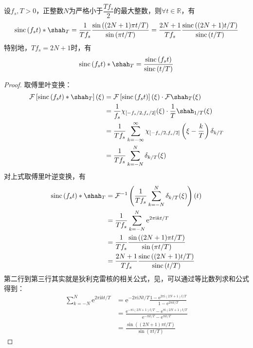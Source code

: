 \begin{lemma}
    设$f_s,T>0$，正整数$N$为严格小于$\dfrac{T f_s}{2}$的最大整数，则$\forall t\in\mathbb{R}$，有
    \begin{align*}
        \mathrm{sinc}\left(f_s t\right)*\shah_T=\frac{1}{T f_s}\frac{\sin\left((2N+1)\pi t/T\right)}{\sin\left(\pi t/T\right)}=\frac{2N+1}{T f_s}\frac{\mathrm{sinc}\left((2N+1)t/T\right)}{\mathrm{sinc}\left(t/T\right)}
    \end{align*}
    特别地，$T f_s=2N+1$时，有
    \begin{align*}
        \mathrm{sinc}\left(f_s t\right)*\shah_T=\frac{\mathrm{sinc}\left(f_s t\right)}{\mathrm{sinc}\left(t/T\right)}
    \end{align*}
\end{lemma}
\begin{proof}
    取傅里叶变换：
\begin{align*}
    \mathcal{F} \left[\mathrm{sinc}\left(f_s t\right)*\shah_T\right](\xi)&=\mathcal{F} \left[\mathrm{sinc}\left(f_s t\right)\right](\xi)\cdot\mathcal{F} \shah_T(\xi)\\
    &=\frac{1}{f_s}\chi_{[-f_s/2,f_s/2]}(\xi)\cdot\frac{1}{T}\shah_{1/T}(\xi)\\
    &=\frac{1}{T f_s}\sum_{k=-\infty}^{\infty}\chi_{[-f_s/2,f_s/2]}\left(\xi-\frac{k}{T}\right)\delta_{k/T}\\
    &=\frac{1}{T f_s}\sum_{k=-N}^{N}\delta_{k/T}(\xi)
\end{align*}
对上式取傅里叶逆变换，有
\begin{align*}
    \mathrm{sinc}\left(f_s t\right)*\shah_T&=\mathcal{F} ^{-1}\left(\frac{1}{T f_s}\sum_{k=-N}^{N}\delta_{k/T}(\xi)\right)(t)\\
    &=\frac{1}{T f_s}\sum_{k=-N}^{N}\mathrm{e}^{2\pi \mathrm{i}kt/T}\\
    &=\frac{1}{T f_s}\frac{\sin\left((2N+1)\pi t/T\right)}{\sin\left(\pi t/T\right)}\\
    &=\frac{2N+1}{T f_s}\frac{\mathrm{sinc}\left((2N+1)t/T\right)}{\mathrm{sinc}\left(t/T\right)}
\end{align*}
第二行到第三行其实就是狄利克雷核的相关公式，见，可以通过等比数列求和公式得到：\begin{align*}
    \sum_{k=-N}^{N}\mathrm{e}^{2\pi \mathrm{i}kt/T}&=\mathrm{e}^{-2\pi \mathrm{i}Nt/T}\frac{1-\mathrm{e}^{2\pi \mathrm{i}(2N+1)t/T}}{1-\mathrm{e}^{2\pi \mathrm{i}t/T}}\\
    &=\frac{\mathrm{e}^{-\pi \mathrm{i}(2N+1)t/T}-\mathrm{e}^{\pi \mathrm{i}(2N+1)t/T}}{\mathrm{e}^{-\pi \mathrm{i}t/T}-\mathrm{e}^{\pi \mathrm{i}t/T}}\\
    &=\frac{\sin\left((2N+1)\pi t/T\right)}{\sin\left(\pi t/T\right)}
\end{align*}
\end{proof}

